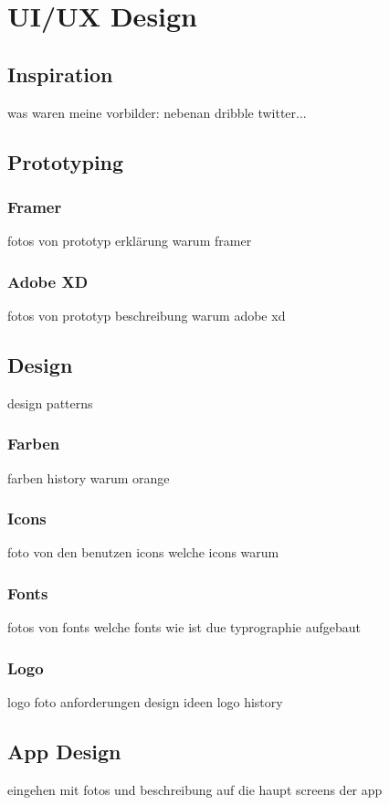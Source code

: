 \section{UI/UX Design}
\author{Martin Hausleitner}
\subsection{Inspiration}
was waren meine vorbilder: nebenan dribble twitter...

\subsection{Prototyping}
\subsubsection{Framer}
fotos von prototyp
erklärung warum framer

\subsubsection{Adobe XD}
fotos von prototyp
beschreibung
warum adobe xd


\subsection{Design}
design patterns
\subsubsection{Farben}
farben history
warum orange
\subsubsection{Icons}
foto von den benutzen icons
welche icons
warum
\subsubsection{Fonts}
fotos von fonts
welche fonts
wie ist due typrographie aufgebaut
\subsubsection{Logo}
logo foto
anforderungen
design ideen
logo history
\subsection{App Design}
eingehen mit fotos und beschreibung auf die haupt screens der app

